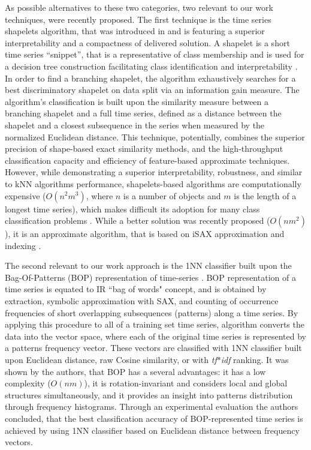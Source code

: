 \documentclass[conference]{IEEEtran}
\begin{document}
As possible alternatives to these two categories, two relevant to our work techniques, 
were recently proposed. 
The first technique is the time series shapelets algorithm,
that was introduced in \cite{shapelet} and is featuring a superior interpretability 
and a compactness of delivered solution. 
A shapelet is a short time series ``snippet'', that is a representative of class
membership and is used for a decision tree construction facilitating class 
identification and interpretability \cite{logical}.
In order to find a branching shapelet, the algorithm exhaustively searches for a best 
discriminatory shapelet on data split via an information gain measure. 
The algorithm's classification is built upon the similarity measure between a branching shapelet 
and a full time series, defined as a distance between the shapelet and a closest 
subsequence in the series when measured by the normalized Euclidean distance. 
This technique, potentially, combines the superior precision of 
shape-based exact similarity methods, and the high-throughput 
classification capacity and efficiency of feature-based approximate techniques. 
However, while demonstrating a superior interpretability, robustness, and similar to kNN 
algorithms performance, shapelets-based algorithms are computationally expensive 
($O(n^{2}m^{3})$, where $n$ is a number of objects and $m$ is the length of a 
longest time series),
which makes difficult its adoption for many class classification problems \cite{bagnal}. 
While a better solution was recently proposed ($O(nm^{2})$), it is an approximate 
algorithm, that is based on iSAX approximation and indexing \cite{fast-shapelets}.

The second relevant to our work approach is the 1NN classifier built upon the 
Bag-Of-Patterns (BOP) representation of time-series \cite{bag_patterns}.
BOP representation of a time series is equated to IR ``bag of words" concept,
and is obtained by extraction, symbolic approximation with SAX, and counting
of occurrence frequencies of short overlapping subsequences 
(patterns) along a time series.
By applying this procedure to all of a training set time series, 
algorithm converts the data into the vector space, where each of the original
time series is represented by a patterns frequency vector. 
These vectors are classified with 1NN classifier built upon Euclidean distance, 
raw Cosine similarity, or with  \textit{tf$\ast$idf} ranking. 
It was shown by the authors, that BOP has a several advantages: it has a low
complexity ($O(nm)$), it is rotation-invariant and considers local and global 
structures simultaneously, and it provides an insight into patterns 
distribution through frequency histograms.
Through an experimental evaluation the authors concluded, that the best classification
accuracy of BOP-represented time series is achieved by using 1NN classifier based 
on Euclidean distance between frequency vectors.
\end{document}
